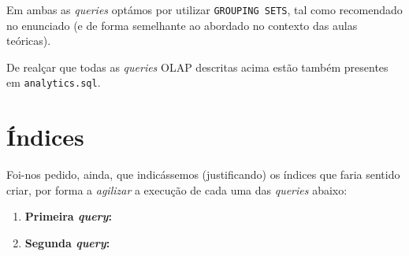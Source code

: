 \documentclass[12pt,a4paper]{article}
\begin{document}
  Em ambas as \textit{queries} optámos por utilizar \texttt{GROUPING SETS}, tal como
  recomendado no enunciado (e de forma semelhante ao abordado no contexto das aulas
  teóricas).

  De realçar que todas as \textit{queries} OLAP descritas acima estão também
  presentes em \texttt{analytics.sql}.

  \section*{Índices}

  Foi-nos pedido, ainda, que indicássemos (justificando) os índices que faria sentido
  criar, por forma a \textit{agilizar} a execução de cada uma das \textit{queries} abaixo:

  \begin{enumerate}
    \item \textbf{Primeira \textit{query}:}
    
    

    \item \textbf{Segunda \textit{query}:}
  
    
  \end{enumerate}
  
\end{document}
